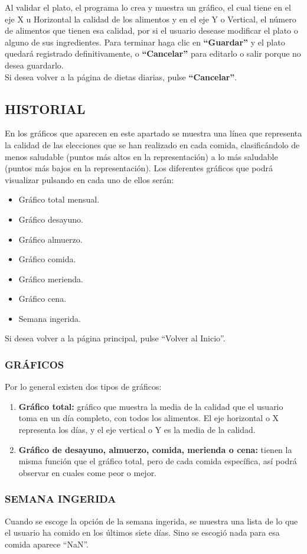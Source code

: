 Al validar el plato, el programa lo crea y muestra un gráfico, el cual tiene en el eje X u Horizontal la calidad de los alimentos y en el eje Y o Vertical, el número de alimentos que tienen esa calidad, por si el usuario desease modificar el plato o alguno de sus ingredientes. Para terminar haga clic en \textbf{“Guardar”} y el plato quedará registrado definitivamente, o \textbf{“Cancelar”} para editarlo o salir porque no desea guardarlo.\\

Si desea volver a la página de dietas diarias, pulse \textbf{“Cancelar”}.

\subsection{HISTORIAL}

En los gráficos que aparecen en este apartado se muestra una línea que representa la calidad de las elecciones que se han realizado en cada comida, clasificándolo de menos saludable (puntos más altos en la representación) a lo más saludable (puntos más bajos en la representación).
Los diferentes gráficos que podrá visualizar pulsando en cada uno de ellos serán:
\begin{itemize}
\item	Gráfico total mensual.
\item	Gráfico desayuno.
\item	Gráfico almuerzo.
\item	Gráfico comida.
\item	Gráfico merienda.
\item	Gráfico cena.
\item	Semana ingerida.
\end{itemize}	

Si desea volver a la página principal, pulse “Volver al Inicio”.
\subsubsection{GRÁFICOS}
Por lo general existen dos tipos de gráficos:
\begin{enumerate}
\item \textbf{Gráfico total:} gráfico que muestra la media de la calidad que el usuario toma en un día completo, con todos los alimentos. El eje horizontal o X representa los días, y el eje vertical o Y es la media de la calidad.
\item \textbf{Gráfico de desayuno, almuerzo, comida, merienda o cena:} tienen la misma función que el gráfico total, pero de cada comida específica, así podrá observar en cuales come peor o mejor.
\end{enumerate}
\subsubsection{SEMANA INGERIDA}
Cuando se escoge la opción de la semana ingerida, se muestra una lista de lo que el usuario ha comido en los últimos siete días. Sino se escogió nada para esa comida aparece “NaN”.